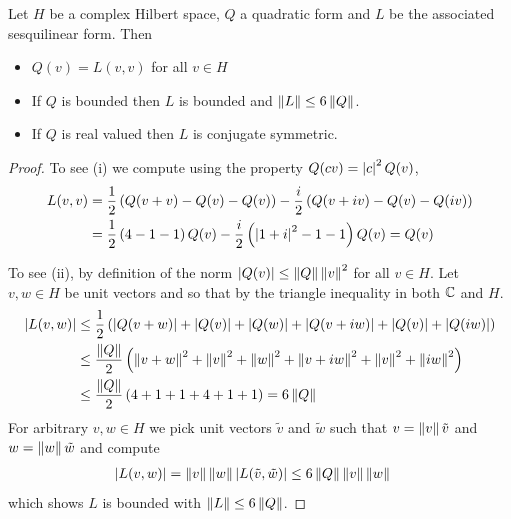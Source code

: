 \begin{prop}\label{hilbert:QuadraticPropertiesToSesquilinearProperties}Let $H$ be a complex Hilbert space, $Q$ a quadratic form and $L$ be the associated sesquilinear form.  Then
\begin{itemize}
\item[(i)] $Q(v) = L(v,v)$ for all $v \in H$
\item[(ii)] If $Q$ is bounded then $L$ is bounded and $\left \lVert L \right \rVert \leq 6 \left \lVert Q \right \rVert$.
\item[(iii)] If $Q$ is real valued then $L$ is conjugate symmetric.
\end{itemize}
\end{prop}
\begin{proof}
To see (i) we compute using the property $Q(c v) = \left \vert c \right \vert^2 Q(v)$,
\begin{align*}
L(v,v) &= \frac{1}{2} \left ( Q(v+v) - Q(v) - Q(v) \right) - \frac{i}{2} \left (Q(v+iv) - Q(v) - Q(iv) \right)  \\
&= \frac{1}{2} \left ( 4 - 1 -1 \right)  Q(v) -  \frac{i}{2} \left ( \left \vert 1+i \right \vert^2 - 1 - 1 \right)  Q(v)  = Q(v)
\end{align*}

To see (ii), by definition of the norm $\left \vert Q(v) \right \vert \leq \left \lVert Q \right \rVert \left \lVert v \right \rVert^2$ for all $v \in H$.  Let $v, w \in H$ be unit vectors and so that by the triangle inequality in both $\mathbb{C}$ and $H$.
\begin{align*}
\left \vert L(v,w) \right \vert &\leq \frac{1}{2} \left(\left \vert Q(v+w) \right \vert + \left \vert Q(v) \right \vert + \left \vert Q(w) \right \vert + \left \vert Q(v+iw) \right \vert + \left \vert Q(v) \right \vert + \left \vert Q(iw) \right \vert \right) \\
&\leq \frac{\left \lVert Q \right \rVert}{2} \left( \left \lVert v+w \right \rVert^2 + \left \lVert v \right \rVert^2 + \left \lVert w \right \rVert^2 + \left \lVert v+iw \right \rVert^2 + \left \lVert v \right \rVert^2 + \left \lVert iw \right \rVert^2 \right ) \\
&\leq \frac{\left \lVert Q \right \rVert}{2} \left( 4 + 1 + 1 + 4 + 1 + 1 \right ) = 6 \left \lVert Q \right \rVert
\end{align*}
For arbitrary $v,w \in H$ we pick unit vectors $\tilde{v}$ and $\tilde{w}$ such that  $v = \left \lVert v \right \rVert \tilde{v}$ and $w = \left \lVert w \right \rVert \tilde{w}$ and compute
\begin{align*}
\left \vert L(v,w) \right \vert &= \left \lVert v \right \rVert \left \lVert w \right \rVert \left \vert L(\tilde{v}, \tilde{w}) \right \vert \leq 6
               \left \lVert Q \right \rVert\left \lVert v \right \rVert \left \lVert w \right \rVert 
\end{align*}
which shows $L$ is bounded with $\left \lVert L \right \rVert \leq 6 \left \lVert Q \right \rVert$.


\end{proof}
